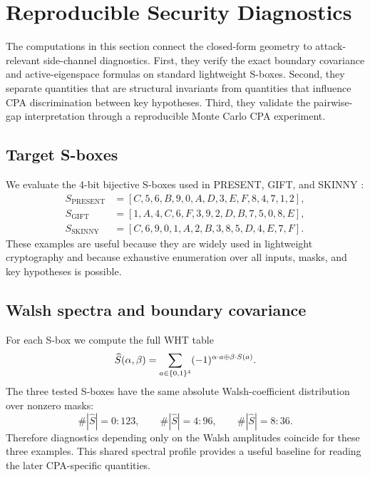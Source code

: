 \section{Reproducible Security Diagnostics}\label{sec:numerical}

The computations in this section connect the closed-form geometry to
attack-relevant side-channel diagnostics.  First, they verify the exact
boundary covariance and active-eigenspace formulas on standard lightweight
S-boxes.  Second, they separate quantities that are structural invariants from
quantities that influence CPA discrimination between key hypotheses.  Third,
they validate the pairwise-gap interpretation through a reproducible Monte
Carlo CPA experiment.

\subsection{Target S-boxes}\label{subsec:sboxes}

We evaluate the 4-bit bijective S-boxes used in PRESENT, GIFT, and SKINNY
\cite{bogdanov2007present,banik2017gift,beierle2016skinny}:
\begin{align*}
S_{\mathrm{PRESENT}}&=[C,5,6,B,9,0,A,D,3,E,F,8,4,7,1,2],\\
S_{\mathrm{GIFT}}&=[1,A,4,C,6,F,3,9,2,D,B,7,5,0,8,E],\\
S_{\mathrm{SKINNY}}&=[C,6,9,0,1,A,2,B,3,8,5,D,4,E,7,F].
\end{align*}
These examples are useful because they are widely used in lightweight
cryptography and because exhaustive enumeration over all inputs, masks, and
key hypotheses is possible.

\subsection{Walsh spectra and boundary covariance}\label{subsec:wht-spectra}

For each S-box we compute the full WHT table
\[
  \widehat S(\alpha,\beta)=\sum_{a\in\{0,1\}^{4}}
  (-1)^{\alpha\cdot a\oplus\beta\cdot S(a)}.
\]
The three tested S-boxes have the same absolute Walsh-coefficient distribution
over nonzero masks:
\[
  \#|\widehat S|=0:123,\qquad
  \#|\widehat S|=4:96,\qquad
  \#|\widehat S|=8:36.
\]
Therefore diagnostics depending only on the Walsh amplitudes coincide for
these three examples.  This shared spectral profile provides a useful baseline
for reading the later CPA-specific quantities.

